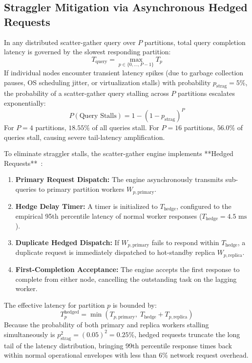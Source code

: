 \subsection{Straggler Mitigation via Asynchronous Hedged Requests}
In any distributed scatter-gather query over $P$ partitions, total query completion latency is governed by the slowest responding partition:
\begin{equation}
    T_{\text{query}} = \max_{p \in \{0, \dots, P-1\}} T_p
\end{equation}
If individual nodes encounter transient latency spikes (due to garbage collection pauses, OS scheduling jitter, or virtualization stalls) with probability $p_{\text{strag}} = 5\%$, the probability of a scatter-gather query stalling across $P$ partitions escalates exponentially:
\begin{equation}
    P(\text{Query Stalls}) = 1 - (1 - p_{\text{strag}})^P
\end{equation}
For $P = 4$ partitions, $18.55\%$ of all queries stall. For $P = 16$ partitions, $56.0\%$ of queries stall, causing severe tail-latency amplification.

To eliminate straggler stalls, the scatter-gather engine implements **Hedged Requests**~\cite{dean2013tail}:
\begin{enumerate}
 \item \textbf{Primary Request Dispatch:} The engine asynchronously transmits sub-queries to primary partition workers $W_{p, \text{primary}}$.
 \item \textbf{Hedge Delay Timer:} A timer is initialized to $T_{\text{hedge}}$, configured to the empirical 95th percentile latency of normal worker responses ($T_{\text{hedge}} = 4.5\text{ ms}$).
 \item \textbf{Duplicate Hedged Dispatch:} If $W_{p, \text{primary}}$ fails to respond within $T_{\text{hedge}}$, a duplicate request is immediately dispatched to hot-standby replica $W_{p, \text{replica}}$.
 \item \textbf{First-Completion Acceptance:} The engine accepts the first response to complete from either node, cancelling the outstanding task on the lagging worker.
\end{enumerate}
The effective latency for partition $p$ is bounded by:
\begin{equation}
    T_p^{\text{hedged}} = \min\left(T_{p, \text{primary}},\; T_{\text{hedge}} + T_{p, \text{replica}}\right)
\end{equation}
Because the probability of both primary and replica workers stalling simultaneously is $p_{\text{strag}}^2 = (0.05)^2 = 0.25\%$, hedged requests truncate the long tail of the latency distribution, bringing 99th percentile response times back within normal operational envelopes with less than $6\%$ network request overhead.
